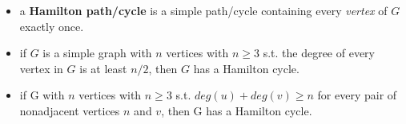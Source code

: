 \documentclass[11pt, oneside]{article}   	%
\begin{document}
\begin{itemize}
\item a \textbf{Hamilton path/cycle} is a simple path/cycle containing every \textit{vertex} of $G$ exactly once.
\item if $G$ is a simple graph with $n$ vertices with $n\geq 3$ s.t. the degree of every vertex in $G$ is at least $n/2$, then $G$ has a Hamilton cycle.
\item if G with $n$ vertices with $n\geq 3$ s.t. $deg(u)+deg(v)\geq n$ for every pair of nonadjacent vertices $n$ and $v$, then G has a Hamilton cycle.
\end{itemize}
\end{document}

